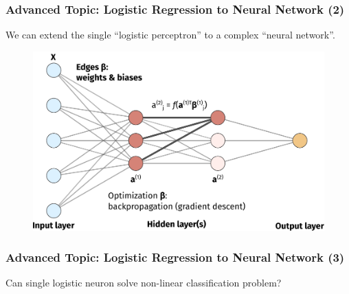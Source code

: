 \documentclass[10pt,aspectratio=169]{beamer}
\begin{document}
      \begin{frame}
        \frametitle{Advanced Topic: Logistic Regression to Neural Network (2)}
        We can extend the single ``logistic perceptron'' to a complex ``neural network''.

        \begin{figure}[t]
          \includegraphics[width=0.85\linewidth]{images/nn-2.pdf}
        \end{figure}
        
      \end{frame}

      \begin{frame}
        \frametitle{Advanced Topic: Logistic Regression to Neural Network (3)}
        Can single logistic neuron solve non-linear classification problem?
        
      \end{frame}
\end{document}

